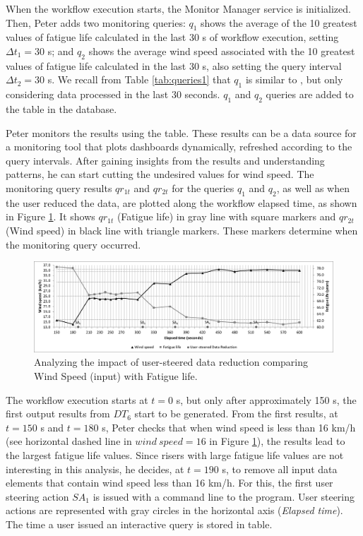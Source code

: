 When the workflow execution starts, the Monitor Manager service is initialized. Then,
Peter adds two monitoring queries:
$q_1$ shows the average of the 10 greatest
values of fatigue life calculated in the last 30 s of workflow execution,
setting $\Delta t_1 = 30$ s; and $q_2$
shows the average wind speed associated with the 10 greatest values of
fatigue life calculated in the last 30 s, also setting the query interval
$\Delta t_2=30$ s. We recall from Table \ref{tab:queries1}  that $q_1$ is
similar to , but only considering data processed in the last 30 seconds.
$q_1$ and $q_2$ queries are added to the
 table in the database.

Peter monitors the results using the  table. These
results can be a data source for a monitoring tool that plots
dashboards dynamically, refreshed according to the query intervals.
After gaining insights from the results and understanding patterns, he
can start cutting the undesired values for wind speed. The monitoring
query results $qr_{1t}$ and $qr_{2t}$ for the queries $q_1$ and $q_2$, as well as when the user reduced the data,
are plotted along the workflow elapsed time, as shown in Figure \ref{fig:wind_elapsed_time}.
  It shows $qr_{1t}$ (Fatigue life) in gray line with
square markers and $qr_{2t}$ (Wind speed) in black line
with triangle markers. These markers determine when the monitoring query
occurred.

\begin{figure}[H]
    \centering
    \includegraphics[width=\textwidth,keepaspectratio]{img/results-rfa-user-steered-data-reduction.pdf}
    \caption{Analyzing the impact of user-steered data reduction comparing Wind Speed (input) with Fatigue life.}
    \label{fig:wind_elapsed_time}
\end{figure}


The
workflow execution starts at $t=0$ s, but only after approximately
150 s, the first output results from $DT_6$ start to be generated.
From the first results, at $t=150$ s and $t=180$ s,
 Peter checks
that when wind speed is less than 16 km/h (see horizontal dashed line in
$wind \ speed  = 16$ in Figure \ref{fig:wind_elapsed_time}),
 the results lead to the largest
fatigue life values. Since risers with large fatigue life values are not
interesting in this analysis, he decides, at $t=190$ s, to remove all input
data elements that contain wind speed less than 16 km/h. For this, the
first user steering action $SA_1$ is issued with a command line to the
 program. User steering actions are represented with gray circles in the
 horizontal axis (\emph{Elapsed time}). The time a user issued an interactive query 
is stored in  table.

